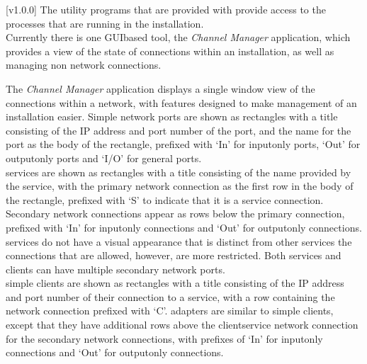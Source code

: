[v1.0.0]
The utility programs that are provided with \mplusm{} provide access to the processes that
are running in the \mplusm{} installation.\\

Currently there is one GUI\longDash{}based tool, the \emph{Channel Manager} application,
which provides a view of the state of connections within an \mplusm{} installation, as
well as managing non\longDash\mplusm{} \yarp{} network connections.

The \emph{Channel Manager} application displays a single window view of the connections
within a \yarp{} network, with features designed to make management of an \mplusm{}
installation easier.
Simple \yarp{} network ports are shown as rectangles with a title consisting of the IP
address and port number of the port, and the \yarp{} name for the port as the body of the
rectangle, prefixed with `In' for input\longDash{}only ports, `Out' for
output\longDash{}only ports and `I/O' for general ports.\\

\mplusm{} services are shown as rectangles with a title consisting of the name provided by
the service, with the primary \yarp{} network connection as the first row in the body of
the rectangle, prefixed with `S' to indicate that it is a service connection.
Secondary \yarp{} network connections appear as rows below the primary connection,
prefixed with `In' for input\longDash{}only connections and `Out' for
output\longDash{}only connections.
\mplusm{}  services do not have a visual appearance that is distinct from
other \mplusm{} services \longDash{} the connections that are allowed, however, are more
restricted.
Both \mplusm{} services and clients can have multiple secondary \yarp{} network ports.\\

\mplusm{} simple clients are shown as rectangles with a title consisting of the IP address
and port number of their connection to a service, with a row containing the \yarp{}
network connection prefixed with `C'.
\mplusm{} adapters are similar to \mplusm{} simple clients, except that they have
additional rows above the client\longDash{}service \yarp{} network connection for the
secondary \yarp{} network connections, with prefixes of `In' for input\longDash{}only
connections and `Out' for output\longDash{}only connections.\\

